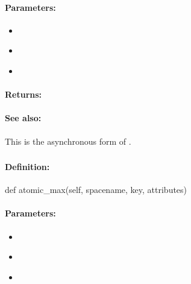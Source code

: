 \paragraph{Parameters:}
\begin{itemize}[noitemsep]
\item {}\\

\item {}\\

\item {}\\

\end{itemize}

\paragraph{Returns:}


\paragraph{See also:}  This is the asynchronous form of .

\pagebreak
\subsubsection{}
\label{api:python:atomic_max}


\paragraph{Definition:}
\begin{pythoncode}
def atomic_max(self, spacename, key, attributes)
\end{pythoncode}

\paragraph{Parameters:}
\begin{itemize}[noitemsep]
\item {}\\

\item {}\\

\item {}\\

\end{itemize}

